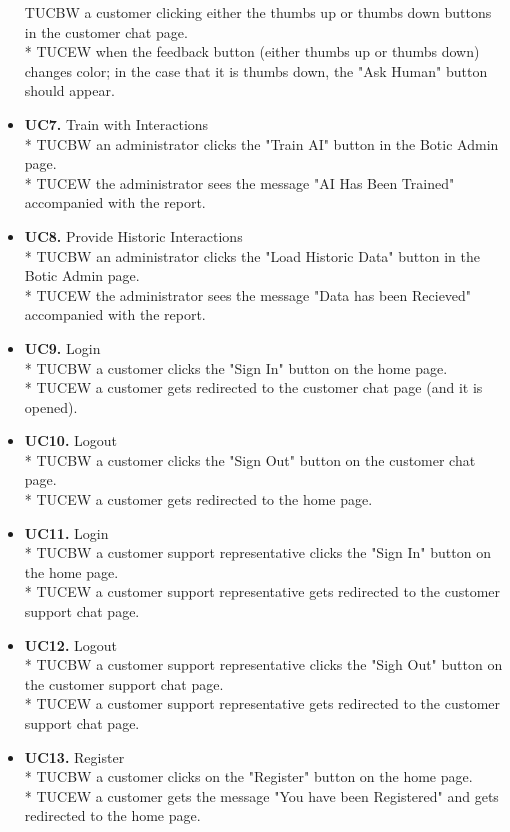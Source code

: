 \documentclass[11pt]{article}
\begin{document}
\begin{itemize}
	TUCBW a customer clicking either the thumbs up or thumbs down buttons in the customer chat page.\\*
	TUCEW when the feedback button (either thumbs up or thumbs down) changes color; in the case that it is thumbs down, the "Ask Human" button should appear.
	\item[] \textbf{UC7.} Train with Interactions\\*
	TUCBW an administrator clicks the "Train AI" button in the Botic Admin page.\\*
	TUCEW the administrator sees the message "AI Has Been Trained" accompanied with the report.
	\item[] \textbf{UC8.} Provide Historic Interactions\\*
	TUCBW an administrator clicks the "Load Historic Data" button in the Botic Admin page.\\*
	TUCEW the administrator sees the message "Data has been Recieved" accompanied with the report.
	\item[] \textbf{UC9.} Login\\*
	TUCBW a customer clicks the "Sign In" button on the home page. \\*
	TUCEW a customer gets redirected to the customer chat page (and it is opened).
	\item[] \textbf{UC10.} Logout\\*
	TUCBW a customer clicks the "Sign Out" button on the customer chat page.\\*
	TUCEW a customer gets redirected to the home page.
	\item[] \textbf{UC11.} Login\\*
	TUCBW a customer support representative clicks the "Sign In" button on the home page. \\*
	TUCEW a customer support representative gets redirected to the customer support chat page.
	\item[] \textbf{UC12.} Logout\\*
	TUCBW a customer support representative clicks the "Sigh Out" button on the customer support chat page.\\*
	TUCEW a customer support representative gets redirected to the customer support chat page.
	\item[] \textbf{UC13.} Register\\*
	TUCBW a customer clicks on the "Register" button on the home page. \\*
	TUCEW a customer gets the message "You have been Registered" and gets redirected to the home page.

\end{itemize}
\end{document}
